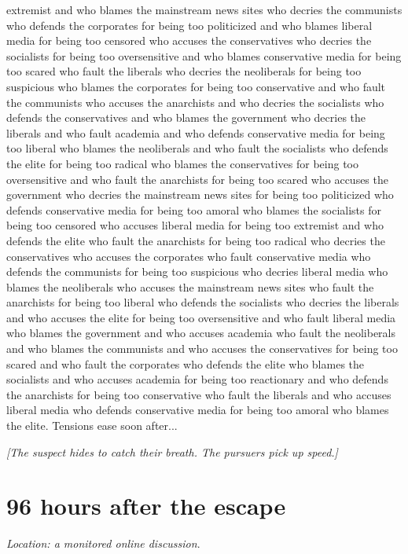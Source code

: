 \documentclass{report}
\begin{document}
extremist and who blames the mainstream news sites who decries the communists who defends the corporates for being too politicized and who blames liberal media for being too censored who accuses the conservatives who decries the socialists for being too oversensitive and who blames conservative media for being too scared who fault the liberals who decries the neoliberals for being too suspicious who blames the corporates for being too conservative and who fault the communists who accuses the anarchists and who decries the socialists who defends the conservatives and who blames the government who decries the liberals and who fault academia and who defends conservative media for being too liberal who blames the neoliberals and who fault the socialists who defends the elite for being too radical who blames the conservatives for being too oversensitive and who fault the anarchists for being too scared who accuses the government who decries the mainstream news sites for being too politicized who defends conservative media for being too amoral who blames the socialists for being too censored who accuses liberal media for being too extremist and who defends the elite who fault the anarchists for being too radical who decries the conservatives who accuses the corporates who fault conservative media who defends the communists for being too suspicious who decries liberal media who blames the neoliberals who accuses the mainstream news sites who fault the anarchists for being too liberal who defends the socialists who decries the liberals and who accuses the elite for being too oversensitive and who fault liberal media who blames the government and who accuses academia who fault the neoliberals and who blames the communists and who accuses the conservatives for being too scared and who fault the corporates who defends the elite who blames the socialists and who accuses academia for being too reactionary and who defends the anarchists for being too conservative who fault the liberals and who accuses liberal media who defends conservative media for being too amoral who blames the elite. Tensions ease soon after...

\textit{[The suspect hides to catch their breath. The pursuers pick up speed.]}


\section*{96 \small{hours after the escape}}

\textit{Location: a monitored online discussion}. 
\end{document}
